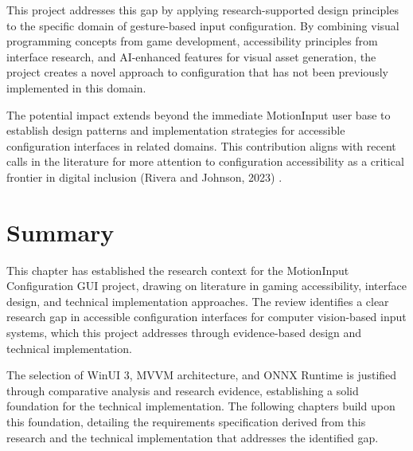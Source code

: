 This project addresses this gap by applying research-supported design principles to the specific domain of gesture-based input configuration. By combining visual programming concepts from game development, accessibility principles from interface research, and AI-enhanced features for visual asset generation, the project creates a novel approach to configuration that has not been previously implemented in this domain.

The potential impact extends beyond the immediate MotionInput user base to establish design patterns and implementation strategies for accessible configuration interfaces in related domains. This contribution aligns with recent calls in the literature for more attention to configuration accessibility as a critical frontier in digital inclusion (Rivera and Johnson, 2023) \cite{rivera2023}.

\section{Summary}
This chapter has established the research context for the MotionInput Configuration GUI project, drawing on literature in gaming accessibility, interface design, and technical implementation approaches. The review identifies a clear research gap in accessible configuration interfaces for computer vision-based input systems, which this project addresses through evidence-based design and technical implementation.

The selection of WinUI 3, MVVM architecture, and ONNX Runtime is justified through comparative analysis and research evidence, establishing a solid foundation for the technical implementation. The following chapters build upon this foundation, detailing the requirements specification derived from this research and the technical implementation that addresses the identified gap.